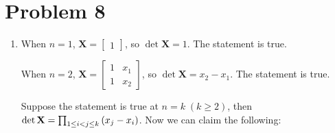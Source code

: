 \documentclass[10pt]{article}
\begin{document}
\section*{Problem 8}
\begin{enumerate}[leftmargin=*, label={(\alph*)}]
    \item When $n = 1$, $\mathbf{X} = \begin{bmatrix}
        1
    \end{bmatrix}$, so $\det\mathbf{X} = 1$. The statement is true.
    \vspace{2mm}
    
    When $n = 2$, $\mathbf{X} = \begin{bmatrix}
        1 & x_1 \\
        1 & x_2 
    \end{bmatrix}$, so $\det\mathbf{X} = x_2 - x_1$. The statement is true.
    \vspace{2mm}

    Suppose the statement is true at $n = k \; (k \geq 2)$, then $\det\mathbf{X} = \prod_{1 \leq i < j \leq k}\qty(x_j - x_i)$. Now we can claim the following:


\end{enumerate}
\end{document}
